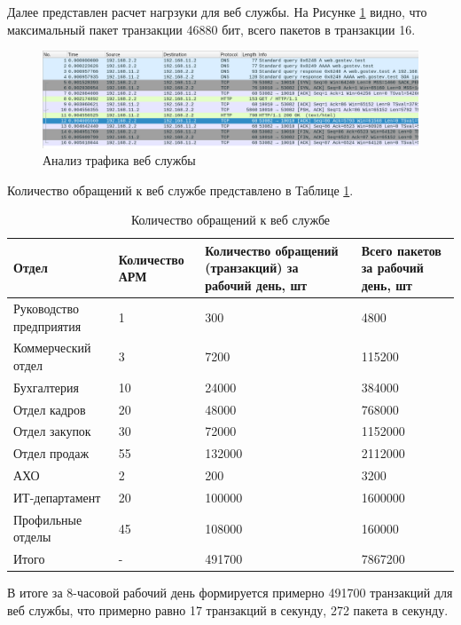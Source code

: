 \documentclass[14pt, a4paper]{extarticle}
\numberwithin{equation}{section}
\begin{document}
Далее представлен расчет нагрзуки для веб службы. На Рисунке 
\ref{fig:wireshark_web_dump} видно, что максимальный
пакет транзакции 46880 бит, всего пакетов в транзакции 16. 
\begin{figure}[H]
        \centering
        \includegraphics[scale=0.6]{web_wireshark.png}
        \caption{Анализ трафика веб службы}
        \label{fig:wireshark_web_dump}
\end{figure}



Количество обращений к веб службе представлено в Таблице \ref{table:web_requests}.

\begin{table}[H]
\centering
\small
\caption{Количество обращений к веб службе}
\label{table:web_requests}
\begin{tabular}{|m{3cm}|m{3cm}|m{4cm}|m{3cm}|}
\hline
\textbf{Отдел} & \textbf{Количество АРМ} & \textbf{Количество обращений (транзакций) за рабочий день, шт } & \textbf{Всего пакетов за рабочий день, шт }\\
\hline
Руководство предприятия & 1 & 300 & 4800 \\
\hline
Коммерческий отдел & 3 & 7200 & 115200 \\
\hline
Бухгалтерия & 10 & 24000 & 384000 \\
\hline
Отдел кадров & 20 & 48000 & 768000 \\
\hline
Отдел закупок & 30 & 72000 & 1152000\\
\hline
Отдел продаж & 55 & 132000 & 2112000 \\
\hline
АХО & 2 & 200 & 3200 \\
\hline
ИТ-департамент & 20 & 100000 & 1600000 \\
\hline
Профильные отделы & 45 & 108000 & 160000 \\
\hline
Итого & - & 491700  &  7867200 \\
\hline
\end{tabular}
\end{table}

В итоге за 8-часовой рабочий день формируется примерно 491700 транзакций для 
веб службы, что примерно равно 
17 транзакций в секунду, 272 пакета в секунду.
\end{document}
